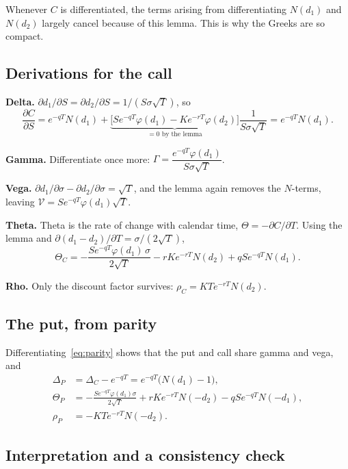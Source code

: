 \documentclass[11pt,a4paper]{article}
\newcommand{\npdf}{\varphi}
\theoremstyle{plain}
\theoremstyle{remark}
\begin{document}
Whenever $C$ is differentiated, the terms arising from differentiating $N(d_1)$ and
$N(d_2)$ largely cancel because of this lemma. This is why the Greeks are so compact.

\subsection{Derivations for the call}

\textbf{Delta.} $\partial d_1/\partial S=\partial d_2/\partial S=1/(S\sigma\sqrt T)$, so
\[
\frac{\partial C}{\partial S}=e^{-qT}N(d_1)+\underbrace{\big[Se^{-qT}\npdf(d_1)-Ke^{-rT}\npdf(d_2)\big]}_{=0\text{ by the lemma}}\frac{1}{S\sigma\sqrt T}
=e^{-qT}N(d_1).
\]

\textbf{Gamma.} Differentiate once more: $\Gamma=\dfrac{e^{-qT}\npdf(d_1)}{S\sigma\sqrt T}$.

\textbf{Vega.} $\partial d_1/\partial\sigma-\partial d_2/\partial\sigma=\sqrt T$, and the lemma again removes the
$N$-terms, leaving $\mathcal V=Se^{-qT}\npdf(d_1)\sqrt T$.

\textbf{Theta.} Theta is the rate of change with calendar time, $\Theta=-\partial C/\partial T$.
Using the lemma and $\partial(d_1-d_2)/\partial T=\sigma/(2\sqrt T)$,
\[
\Theta_C=-\frac{Se^{-qT}\npdf(d_1)\,\sigma}{2\sqrt T}-rKe^{-rT}N(d_2)+qSe^{-qT}N(d_1).
\]

\textbf{Rho.} Only the discount factor survives: $\rho_C=KTe^{-rT}N(d_2)$.

\subsection{The put, from parity}

Differentiating~\eqref{eq:parity} shows that the put and call share gamma and vega, and
\begin{align*}
\Delta_P&=\Delta_C-e^{-qT}=e^{-qT}\big(N(d_1)-1\big), \\
\Theta_P&=-\frac{Se^{-qT}\npdf(d_1)\sigma}{2\sqrt T}+rKe^{-rT}N(-d_2)-qSe^{-qT}N(-d_1), \\
\rho_P&=-KTe^{-rT}N(-d_2).
\end{align*}

\subsection{Interpretation and a consistency check}
\end{document}
